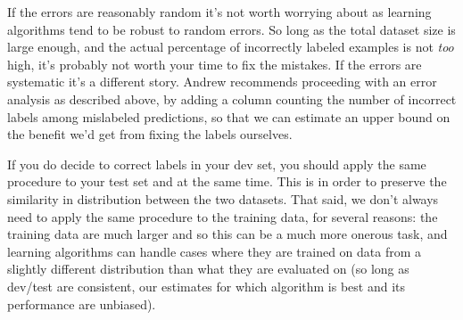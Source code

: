 \documentclass[12pt]{article}
\begin{document}
If the errors are reasonably random it's not worth worrying about as learning algorithms tend to be robust to random errors.
So long as the total dataset size is large enough, and the actual percentage of incorrectly labeled examples is not \emph{too} high,
it's probably not worth your time to fix the mistakes. If the errors are systematic it's a different story. Andrew recommends proceeding with an error analysis as described above, by adding a column counting the number of incorrect labels among mislabeled predictions, so that we can estimate an upper bound on the benefit we'd get from fixing the labels ourselves.

If you do decide to correct labels in your dev set, you should apply the same procedure to your test set and at the same time. This
is in order to preserve the similarity in distribution between the two datasets. That said, we don't always need to apply the same
procedure to the training data, for several reasons: the training data are much larger and so this can be a much more onerous task, and learning algorithms can handle cases where they are trained on data from a slightly different distribution than what they are evaluated on (so long as dev/test are consistent, our estimates for which algorithm is best and its performance are unbiased).
\end{document}
